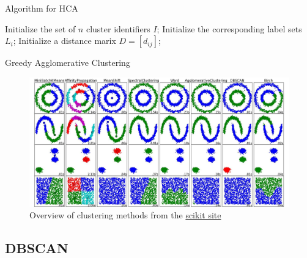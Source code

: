 \documentclass{beamer}
\begin{document}
\begin{frame}[fragile]{Algorithm for HCA}
    \begin{algorithm}[H]
        \DontPrintSemicolon
          
        Initialize the set of $n$ cluster identifiers $I$;
        Initialize the corresponding label sets $L_i$;
        Initialize a distance marix $D=[d_{ij}]$;

        \;
        \caption{Greedy Agglomerative Clustering}
    \end{algorithm}
\end{frame}

\begin{frame}
    \begin{figure}
        \includegraphics[width=\linewidth]{clustering}
        \caption{Overview of clustering methods from the \href{https://scikit-learn.org/stable/modules/clustering.html}{scikit site}}
    \end{figure}
\end{frame}

\subsection{DBSCAN}
\end{document}
